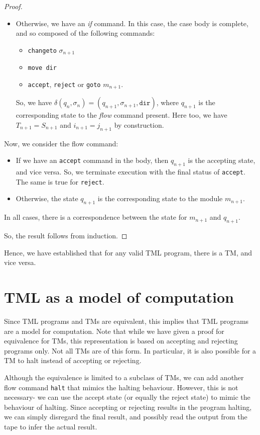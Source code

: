 \documentclass{article}
\begin{document}
\begin{proof}
\begin{itemize}
\begin{itemize}
                \item Otherwise, we have an \textit{if} command. In this case, the case body is complete, and so composed of the following commands:
                \begin{itemize}
                    \item \texttt{changeto} $\sigma_{n+1}$
                    \item \texttt{move dir}
                    \item \texttt{accept}, \texttt{reject} or \texttt{goto} $m_{n+1}$.
                \end{itemize}
                So, we have $\delta(q_n, \sigma_n) = (q_{n+1}, \sigma_{n+1}, \texttt{dir})$, where $q_{n+1}$ is the corresponding state to the \textit{flow} command present. Here too, we have $T_{n+1} = S_{n+1}$ and $i_{n+1} = j_{n+1}$ by construction. 
            \end{itemize}
            Now, we consider the flow command:
            \begin{itemize}
                \item If we have an \texttt{accept} command in the body, then $q_{n+1}$ is the accepting state, and vice versa. So, we terminate execution with the final status of \texttt{accept}. The same is true for \texttt{reject}. 
                \item Otherwise, the state $q_{n+1}$ is the corresponding state to the module $m_{n+1}$.
            \end{itemize}
            In all cases, there is a correspondence between the state for $m_{n+1}$ and $q_{n+1}$.   
        \end{itemize}
        So, the result follows from induction.
    \end{proof}

    Hence, we have established that for any valid TML program, there is a TM, and vice versa.

    \section{TML as a model of computation}
    Since TML programs and TMs are equivalent, this implies that TML programs are a model for computation. Note that while we have given a proof for equivalence for TMs, this representation is based on accepting and rejecting programs only. Not all TMs are of this form. In particular, it is also possible for a TM to halt instead of accepting or rejecting.

    Although the equivalence is limited to a subclass of TMs, we can add another flow command \texttt{halt} that mimics the halting behaviour. However, this is not necessary- we can use the accept state (or equally the reject state) to mimic the behaviour of halting. Since accepting or rejecting results in the program halting, we can simply disregard the final result, and possibly read the output from the tape to infer the actual result.
\end{document}
